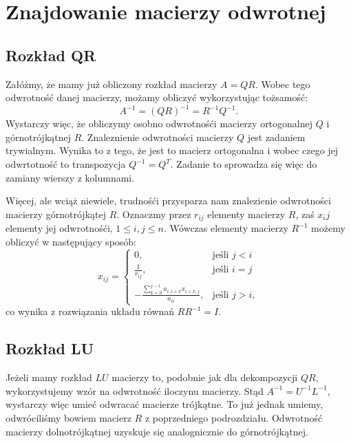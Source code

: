 \section{Znajdowanie macierzy odwrotnej}
\subsection{Rozkład QR}
Załóżmy, że mamy już obliczony rozkład macierzy $A=QR$. Wobec tego
odwrotność danej macierzy, możamy obliczyć wykorzystując tożsamość:
$$A^{-1}=(QR)^{-1}= R^{-1}Q^{-1}.$$
Wystarczy więc, że obliczymy osobno odwrotnośći macierzy ortogonalnej $Q$ i
górnotrójkątnej $R$. Znaleznienie odwrotności macierzy $Q$ jest zadaniem
trywialnym. Wynika to z tego, że jest to macierz ortogonalna i
wobec czego jej odwrtotność to transpozycja
$Q^{-1}=Q^{T}$. Zadanie to sprowadza się więc do zamiany wierszy z
kolumnami.

Więcej, ale wciąż niewiele, trudnośći przysparza nam znalezienie odwrotności
macierzy górnotrójkątej $R$. Oznaczmy przez $r_{ij}$ elementy macierzy $R$,
zaś $x_ij$ elementy jej odwrotnośći, $1 \leq i,j \leq n$. Wówczas elementy
macierzy $R^{-1}$ możemy obliczyć w następujący sposób:
$$ x_{ij}=
\begin{cases}
0, & \text{jeśli } j<i \\[8pt]
\displaystyle \frac{1}{r_{ij}}, & \text{jeśli } i=j \\[8pt]
\displaystyle -\frac{\sum_{k=0}^{j-i}a_{i,i+k}x_{i+k,j}}{a_{ii}}, & \text{jeśli } j>i, 
\end{cases}
$$
co wynika z rozwiązania układu równań $RR^{-1}=I$.
\subsection{Rozkład LU}
Jeżeli mamy rozkład $LU$ macierzy to, podobnie jak dla dekompozycji $QR$,
wykorzystujemy wzór na odwrotność iloczynu macierzy. Stąd $A^{-1}=U^{-1}L^{-1}$,
wystarczy więc umieć odwracać macierze trójkątne. To już jednak umiemy, odwróciliśmy
bowiem macierz $R$ z poprzedniego podrozdziału. Odwrotność macierzy dolnotrójkątnej
uzyskuje się analognicznie do górnotrójkątnej.
